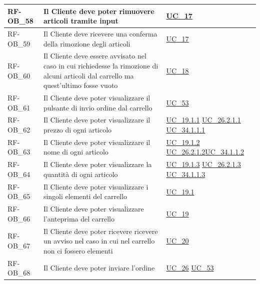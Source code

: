 \begin{longtable}{|>{\raggedright}p{}|>{\raggedright\arraybackslash}p{}|>{\raggedright\arraybackslash}p{}|}
	\hline
	RF-OB\_58 \hypertarget{rf-ob_58} & Il Cliente deve poter rimuovere articoli tramite input & \hyperref[uc_17]{UC\_17} \\
	\hline
	RF-OB\_59 \hypertarget{rf-ob_59} & Il Cliente deve ricevere una conferma della rimozione degli articoli & \hyperref[uc_17]{UC\_17} \\
	\hline
	RF-OB\_60 \hypertarget{rf-ob_60} & Il Cliente deve essere avvisato nel caso in cui richiedesse la rimozione di alcuni articoli dal carrello ma quest'ultimo fosse vuoto & \hyperref[uc_18]{UC\_18} \\
	\hline
	RF-OB\_61 \hypertarget{rf-ob_61} & Il Cliente deve poter visualizzare il pulsante di invio ordine dal carrello & \hyperref[uc_53]{UC\_53} \\
	\hline
	RF-OB\_62 \hypertarget{rf-ob_62} & Il Cliente deve poter visualizzare il prezzo di ogni articolo & \hyperref[uc_19.1.1]{UC\_19.1.1} \newline \hyperref[uc_26.2.1.1]{UC\_26.2.1.1} \newline \hyperref[uc_34.1.1.1]{UC\_34.1.1.1} \\
	\hline
	RF-OB\_63 \hypertarget{rf-ob_63} & Il Cliente deve poter visualizzare il nome di ogni articolo & \hyperref[uc_19.1.2]{UC\_19.1.2} \newline \hyperref[uc_26.2.1.2]{UC\_26.2.1.2}\newline \hyperref[uc_34.1.1.2]{UC\_34.1.1.2}\\
	\hline
	RF-OB\_64 \hypertarget{rf-ob_64} & Il Cliente deve poter visualizzare la quantità di ogni articolo & \hyperref[uc_19.1.3]{UC\_19.1.3} \newline \hyperref[uc_26.2.1.3]{UC\_26.2.1.3} \newline \hyperref[uc_34.1.1.3]{UC\_34.1.1.3}\\
	\hline
	RF-OB\_65 \hypertarget{rf-ob_65} & Il Cliente deve poter visualizzare i singoli elementi del carrello & \hyperref[uc_19.1]{UC\_19.1} \\
	\hline
	RF-OB\_66 \hypertarget{rf-ob_66} & Il Cliente deve poter visualizzare l'anteprima del carrello & \hyperref[uc_19]{UC\_19} \\
	\hline
	RF-OB\_67 \hypertarget{rf-ob_67} & Il Cliente deve poter ricevere ricevere un avviso nel caso in cui nel carrello non ci fossero elementi & \hyperref[uc_20]{UC\_20} \\
	\hline
	RF-OB\_68 \hypertarget{rf-ob_68} & Il Cliente deve poter inviare l'ordine & \hyperref[uc_26]{UC\_26} \newline \hyperref[uc_53]{UC\_53} \\

\end{longtable}
